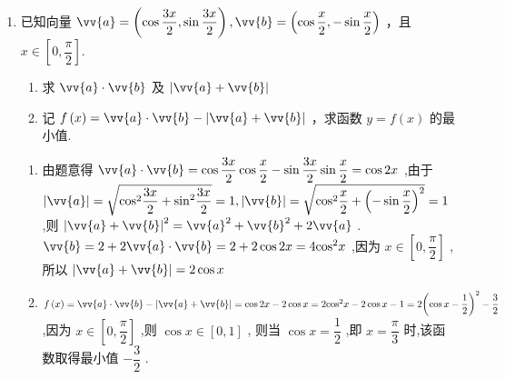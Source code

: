 \begin{enumerate}
\begin{enumerate}
\begin{jieda}
\begin{enumerate}
                又 $x \in  \left\lbrack  {0,\dfrac{\pi }{2}}\right\rbrack$ ,从而 $\sin x = \dfrac{\sqrt{3}}{2}$ ,所以 $x = \dfrac{\pi }{3}$ .
                \item $f\left( x\right)  = \vv{a} \cdot  \vv{b} = 3\sin x \cdot  \cos x + \sqrt{3}{\sin }^{2}x - \dfrac{3}{2}\sin {2x} - \dfrac{\sqrt{3}}{2}\cos {2x} + \dfrac{\sqrt{3}}{2}$
                
                $\sqrt{3}\left( {\dfrac{\sqrt{3}}{2}\sin {2x} - \dfrac{1}{2}\cos {2x}}\right)  + \dfrac{\sqrt{3}}{2} = \sqrt{3}\sin \left( {{2x} - \dfrac{\pi }{6}}\right)  + \dfrac{\sqrt{3}}{2}$ ,
                
                当 $x = \dfrac{\pi }{3} \in  \left\lbrack  {0,\dfrac{\pi }{2}}\right\rbrack$ 时, $\sin \left( {{2x} - \dfrac{\pi }{3}}\right)$ 取最大值 1,所以 $f\left( x\right)$ 的最大值为 $\dfrac{3\sqrt{3}}{2}$ .
            \end{enumerate}
        \end{jieda}
        \item 已知向量 $\vv{a} = \left( {\cos \dfrac{3x}{2},\sin \dfrac{3x}{2}}\right) ,\vv{b} = \left( {\cos \dfrac{x}{2}, - \sin \dfrac{x}{2}}\right)$ ，且 $x \in  \left\lbrack 0,\dfrac{\pi }{2}\right\rbrack$.
        \begin{enumerate}
            \item 求 $\vv{a} \cdot  \vv{b}$ 及 $\left| {\vv{a} + \vv{b}}\right|$
            \item 记 $f\left( x\right)  = \vv{a} \cdot  \vv{b} - \left| {\vv{a} + \vv{b}}\right|$ ，求函数 $y = f\left( x\right)$ 的最小值.
        \end{enumerate}
        \begin{jieda}
            \begin{enumerate}
                \item 由题意得 $\vv{a} \cdot  \vv{b} = \cos \dfrac{3x}{2}\cos \dfrac{x}{2} - \sin \dfrac{3x}{2}\sin \dfrac{x}{2} =  \cos {2x}$ ,由于 $\left| \vv{a}\right|  = \sqrt{{\cos }^{2}\dfrac{3x}{2} + {\sin }^{2}\dfrac{3x}{2}} = 1,\left| \vv{b}\right|  = \sqrt{{\cos }^{2}\dfrac{x}{2} + {\left( -\sin \dfrac{x}{2}\right) }^{2}} = 1$ ,则 ${\left| \vv{a} + \vv{b}\right| }^{2} = {\vv{a}}^{2} + {\vv{b}}^{2} + 2\vv{a}$ . $\vv{b} = 2 + 2\vv{a} \cdot  \vv{b} = 2 + 2\cos {2x} = 4{\cos }^{2}x$ ,因为 $x \in  \left\lbrack  {0,\dfrac{\pi }{2}}\right\rbrack$ ,所以 $\left| {\vv{a} + \vv{b}}\right|  = 2\cos x$
                
                \item $f\left( x\right)  = \vv{a} \cdot  \vv{b} - \left| {\vv{a} + \vv{b}}\right|  = \cos {2x} - 2\cos x = 2{\cos }^{2}x - 2\cos x - 1  = 2{\left( \cos x - \dfrac{1}{2}\right) }^{2} - \dfrac{3}{2}$ ,因为 $x \in  \left\lbrack  {0,\dfrac{\pi }{2}}\right\rbrack$ ,则 $\cos x \in  \left\lbrack  {0,1}\right\rbrack$ , 则当 $\cos x = \dfrac{1}{2}$ ,即 $x = \dfrac{\pi }{3}$ 时,该函数取得最小值 $- \dfrac{3}{2}$ .
            \end{enumerate}
        \end{jieda}
    \end{enumerate}
    

\end{enumerate}
